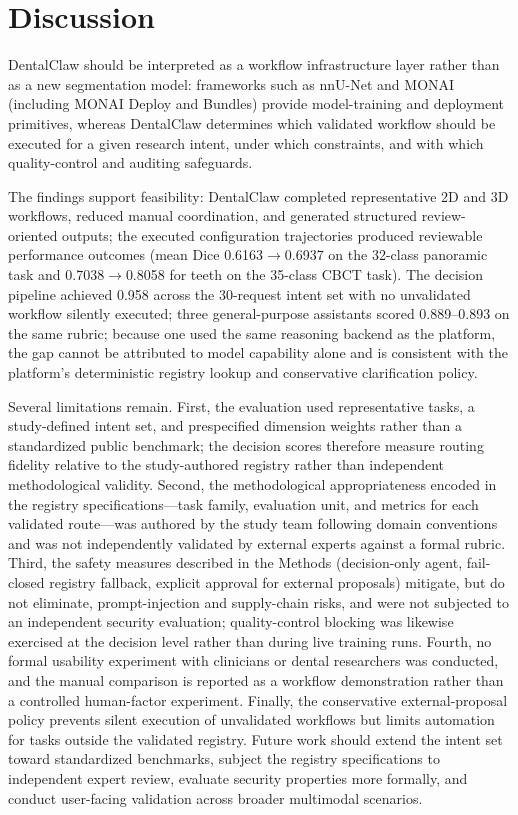 \documentclass[final,5p,times,twocolumn]{elsarticle}
\begin{document}
\section{Discussion}
DentalClaw should be interpreted as a workflow infrastructure layer rather than as a new segmentation model: frameworks such as nnU-Net and MONAI (including MONAI Deploy and Bundles) provide model-training and deployment primitives, whereas DentalClaw determines which validated workflow should be executed for a given research intent, under which constraints, and with which quality-control and auditing safeguards.

The findings support feasibility: DentalClaw completed representative 2D and 3D workflows, reduced manual coordination, and generated structured review-oriented outputs; the executed configuration trajectories produced reviewable performance outcomes (mean Dice 0.6163$\rightarrow$0.6937 on the 32-class panoramic task and 0.7038$\rightarrow$0.8058 for teeth on the 35-class CBCT task). The decision pipeline achieved 0.958 across the 30-request intent set with no unvalidated workflow silently executed; three general-purpose assistants scored 0.889--0.893 on the same rubric; because one used the same reasoning backend as the platform, the gap cannot be attributed to model capability alone and is consistent with the platform's deterministic registry lookup and conservative clarification policy.

Several limitations remain. First, the evaluation used representative tasks, a study-defined intent set, and prespecified dimension weights rather than a standardized public benchmark; the decision scores therefore measure routing fidelity relative to the study-authored registry rather than independent methodological validity. Second, the methodological appropriateness encoded in the registry specifications---task family, evaluation unit, and metrics for each validated route---was authored by the study team following domain conventions and was not independently validated by external experts against a formal rubric. Third, the safety measures described in the Methods (decision-only agent, fail-closed registry fallback, explicit approval for external proposals) mitigate, but do not eliminate, prompt-injection and supply-chain risks, and were not subjected to an independent security evaluation; quality-control blocking was likewise exercised at the decision level rather than during live training runs. Fourth, no formal usability experiment with clinicians or dental researchers was conducted, and the manual comparison is reported as a workflow demonstration rather than a controlled human-factor experiment. Finally, the conservative external-proposal policy prevents silent execution of unvalidated workflows but limits automation for tasks outside the validated registry. Future work should extend the intent set toward standardized benchmarks, subject the registry specifications to independent expert review, evaluate security properties more formally, and conduct user-facing validation across broader multimodal scenarios.
\end{document}
